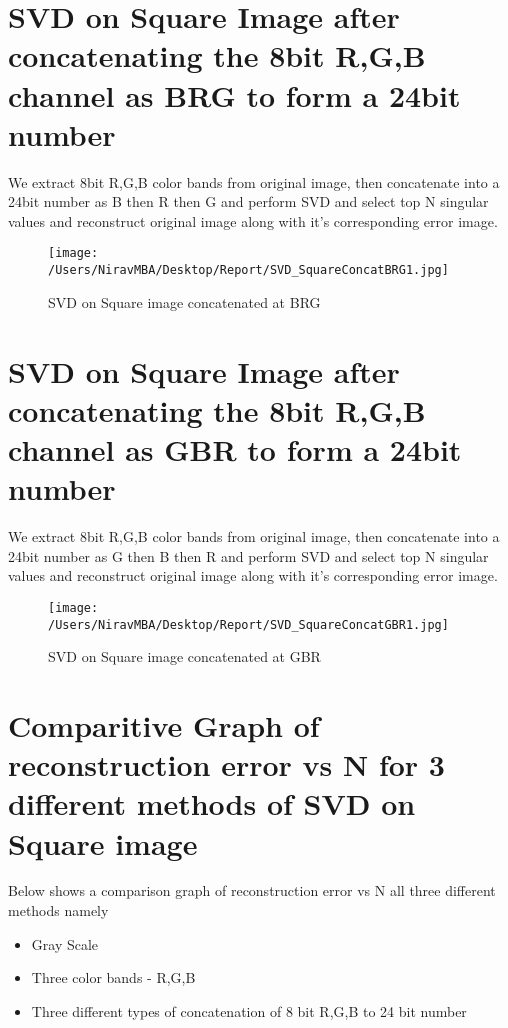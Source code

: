 \documentclass[12pt]{report}
\begin{document}
\section{SVD on Square Image after concatenating the 8bit R,G,B channel as BRG to form a 24bit number }

We extract 8bit R,G,B color bands from original image, then concatenate into a 24bit number as B then R then G and perform SVD and select top N singular values and reconstruct original image along with it's corresponding error image.\\

\begin{figure}[H]
	
	\texttt{[image: /Users/NiravMBA/Desktop/Report/SVD\_SquareConcatBRG1.jpg]}
	\caption{SVD on Square image concatenated at BRG}
\end{figure}

\cleardoublepage

\section{SVD on Square Image after concatenating the 8bit R,G,B channel as GBR to form a 24bit number }

We extract 8bit R,G,B color bands from original image, then concatenate into a 24bit number as G then B then R and perform SVD and select top N singular values and reconstruct original image along with it's corresponding error image.\\

\begin{figure}[H]
	
	\texttt{[image: /Users/NiravMBA/Desktop/Report/SVD\_SquareConcatGBR1.jpg]}
	\caption{SVD on Square image concatenated at GBR}
\end{figure}

\cleardoublepage

\section{Comparitive Graph of reconstruction error vs N for 3 different methods of SVD on Square image }
 Below shows a comparison graph of reconstruction error vs N all three different methods namely \\  
 
 \begin{itemize}
 	\item Gray Scale
 	\item Three color bands - R,G,B
 	\item Three different types of concatenation of 8 bit R,G,B to 24 bit number
 \end{itemize}
\end{document}
